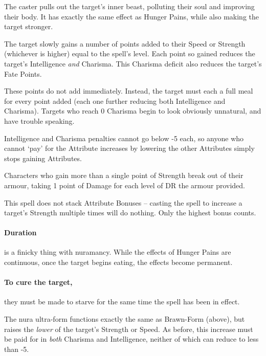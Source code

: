 \begin{multicols}{2}
The caster pulls out the target's inner beast, polluting their soul and improving their body.
It has exactly the same effect as Hunger Pains, while also making the target stronger.

The target slowly gains a number of points added to their Speed or Strength (whichever is higher) equal to the spell's level.
Each point so gained reduces the target's Intelligence \emph{and} Charisma.
This Charisma deficit also reduces the target's Fate Points.

These points do not add immediately.
Instead, the target must each a full meal for every point added (each one further reducing both Intelligence and Charisma).
Targets who reach 0 Charisma begin to look obviously unnatural, and have trouble speaking.

Intelligence and Charisma penalties cannot go below -5 each, so anyone who cannot `pay' for the Attribute increases by lowering the other Attributes simply stops gaining Attributes.

Characters who gain more than a single point of Strength break out of their armour, taking 1 point of Damage for each level of DR the armour provided.

This spell does not stack Attribute Bonuses -- casting the spell to increase a target's Strength multiple times will do nothing.
Only the highest bonus counts.

\paragraph{Duration}
is a finicky thing with nuramancy.
While the effects of Hunger Pains are continuous, once the target begins eating, the effects become permanent.

\paragraph{To cure the target,}
they must be made to starve for the same time the spell has been in effect.
\label{nura_recovery}

\spelllevel


The nura ultra-form functions exactly the same as Brawn-Form (above), but raises the \emph{lower} of the target's Strength or Speed.
As before, this increase must be paid for in \emph{both} Charisma and Intelligence, neither of which can reduce to less than -5.


\end{multicols}
